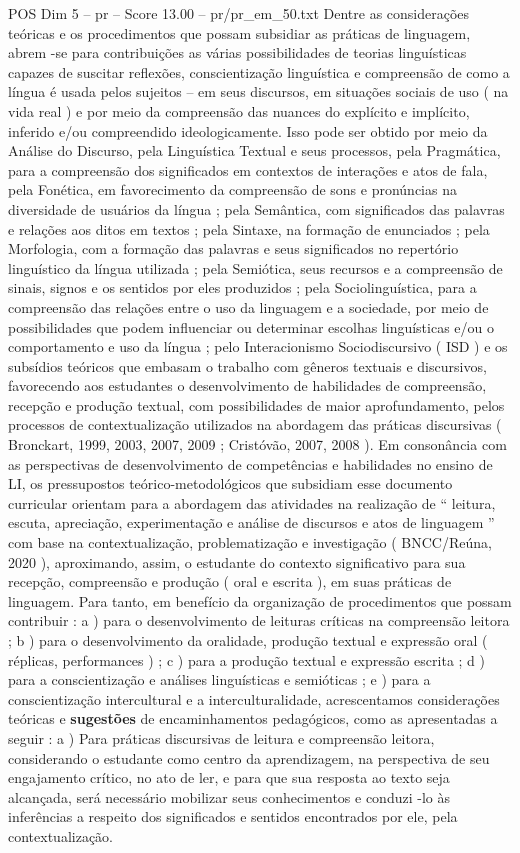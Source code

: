 \begin{textsample}{POS Dim 5 – pr – Score 13.00 – pr/pr\_em\_50.txt}
Dentre as considerações teóricas e os procedimentos que possam subsidiar as práticas de linguagem, abrem -se para contribuições as várias possibilidades de teorias linguísticas capazes de suscitar reflexões, conscientização linguística e compreensão de como a língua é usada pelos sujeitos – em seus discursos, em situações sociais de uso ( na vida real ) e por meio da compreensão das nuances do explícito e implícito, inferido e/ou compreendido ideologicamente.
Isso pode ser obtido por meio da Análise do Discurso, pela Linguística Textual e seus processos, pela Pragmática, para a compreensão dos significados em contextos de interações e atos de fala, pela Fonética, em favorecimento da compreensão de sons e pronúncias na diversidade de usuários da língua ; pela Semântica, com significados das palavras e relações aos ditos em textos ; pela Sintaxe, na formação de enunciados ; pela Morfologia, com a formação das palavras e seus significados no repertório linguístico da língua utilizada ; pela Semiótica, seus recursos e a compreensão de sinais, signos e os sentidos por eles produzidos ; pela Sociolinguística, para a compreensão das relações entre o uso da linguagem e a sociedade, por meio de possibilidades que podem influenciar ou determinar escolhas linguísticas e/ou o comportamento e uso da língua ; pelo Interacionismo Sociodiscursivo ( ISD ) e os subsídios teóricos que embasam o trabalho com gêneros textuais e discursivos, favorecendo aos estudantes o desenvolvimento de habilidades de compreensão, recepção e produção textual, com possibilidades de maior aprofundamento, pelos processos de contextualização utilizados na abordagem das práticas discursivas ( Bronckart, 1999, 2003, 2007, 2009 ; Cristóvão, 2007, 2008 ).
Em consonância com as perspectivas de desenvolvimento de competências e habilidades no ensino de LI, os pressupostos teórico-metodológicos que subsidiam esse documento curricular orientam para a abordagem das atividades na realização de “ leitura, escuta, apreciação, experimentação e análise de discursos e atos de linguagem ” com base na contextualização, problematização e investigação ( BNCC/Reúna, 2020 ), aproximando, assim, o estudante do contexto significativo para sua recepção, compreensão e produção ( oral e escrita ), em suas práticas de linguagem.
Para tanto, em benefício da organização de procedimentos que possam contribuir : a ) para o desenvolvimento de leituras críticas na compreensão leitora ; b ) para o desenvolvimento da oralidade, produção textual e expressão oral ( réplicas, performances ) ; c ) para a produção textual e expressão escrita ; d ) para a conscientização e análises linguísticas e semióticas ; e ) para a conscientização intercultural e a interculturalidade, acrescentamos considerações teóricas e \textbf{sugestões} de encaminhamentos pedagógicos, como as apresentadas a seguir : a ) Para práticas discursivas de leitura e compreensão leitora, considerando o estudante como centro da aprendizagem, na perspectiva de seu engajamento crítico, no ato de ler, e para que sua resposta ao texto seja alcançada, será necessário mobilizar seus conhecimentos e conduzi -lo às inferências a respeito dos significados e sentidos encontrados por ele, pela contextualização.

\end{textsample}
